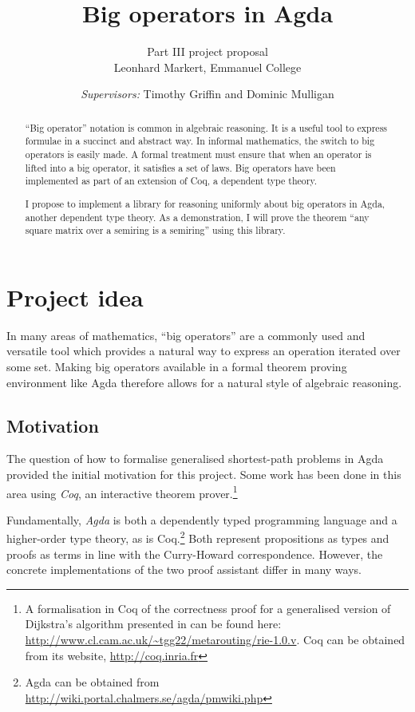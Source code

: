 \documentclass[a4paper]{scrartcl}
\title{Big operators in Agda}
\author{Part III project proposal\\
	Leonhard Markert, Emmanuel College}
\date{\textit{Supervisors:} Timothy Griffin and Dominic Mulligan}
\begin{document}
\maketitle

\begin{abstract}
\enquote{Big operator} notation is common in algebraic reasoning.
It is a useful tool to express formulae in a succinct and abstract way.
In informal mathematics, the switch to big operators is easily made.
A formal treatment must ensure that when an operator is lifted into a big operator, it satisfies a set of laws.
Big operators have been implemented as part of an extension of Coq, a dependent type theory.

I propose to implement a library for reasoning uniformly about big operators in Agda, another dependent type theory.
As a demonstration, I will prove the theorem \enquote{any square matrix over a semiring is a semiring} using this library.
\end{abstract}

\section{Project idea}

In many areas of mathematics, \enquote{big operators} are a commonly used and versatile tool which provides a natural way to express an operation iterated over some set. Making big operators available in a formal theorem proving environment like Agda therefore allows for a natural style of algebraic reasoning.

\subsection{Motivation}

The question of how to formalise generalised shortest-path problems in Agda provided the initial motivation for this project.
Some work has been done in this area using \emph{Coq}, an interactive theorem prover.\footnote{A formalisation in Coq of the correctness proof for a generalised version of Dijkstra's algorithm presented in \autocite{sobrinho_routing_2010} can be found here: \url{http://www.cl.cam.ac.uk/~tgg22/metarouting/rie-1.0.v}. Coq can be obtained from its website, \url{http://coq.inria.fr}}

Fundamentally, \emph{Agda} is both a dependently typed programming language and a higher-order type theory, as is Coq.\footnote{Agda can be obtained from \url{http://wiki.portal.chalmers.se/agda/pmwiki.php}} Both represent propositions as types and proofs as terms in line with the Curry-Howard correspondence. 
However, the concrete implementations of the two proof assistant differ in many ways.
\end{document}
